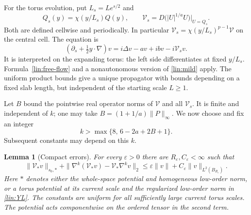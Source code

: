 \documentclass[11pt]{article}
\numberwithin{equation}{section}
\newtheorem{lemma}[theorem]{Lemma}
\theoremstyle{definition}
\theoremstyle{remark}
\begin{document}
For the torus evolution, put $L_s=Le^{s/2}$ and
\begin{equation}\label{lin:torus-coefficients}
 Q_s(y)=\chi(y/L_s)Q(y),\qquad
 \mathcal V_s=D\big(|U|^{1/a}U\big)\big|_{U=Q_s}.
\end{equation}
Both are defined cellwise and periodically.  In particular
$\mathcal V_s=\chi(y/L_s)^{p-1}\mathcal V$ on the central cell.
The equation is
\begin{equation}\label{lin:torus-evolution}
 (\partial_s+\tfrac12y\cdot\nabla)v
       =i\Delta v-a v+ibv-i\mathcal V_s v.
\end{equation}
It is interpreted on the expanding torus: the left side differentiates
at fixed $y/L_s$.  Formula~\eqref{lin:free-flow} and a nonautonomous
version of \eqref{lin:mild} apply.  The uniform product bounds give a
unique propagator with bounds depending on a fixed slab length, but
independent of the starting scale $L\ge1$.

Let $B$ bound the pointwise real operator norms of $\mathcal V$ and all
$\mathcal V_s$.  It is finite and independent of $k$; one may take
$B=(1+1/a)\|P\|_\infty$.  We now choose and fix an integer
\begin{equation}\label{lin:k-choice}
 k>\max\{8,\,6-2a+2B+1\}.
\end{equation}
Subsequent constants may depend on this $k$.

\begin{lemma}[Compact errors]\label{lin:compact-error}
For every $\varepsilon>0$ there are $R_\varepsilon,C_\varepsilon<\infty$
such that
\begin{equation}\label{lin:compact-bound}
 \|\mathcal V_*v\|_{s_0,*}
 +\|\nabla^k(\mathcal V_*v)-\mathcal V_*\nabla^kv\|_2
 \le\varepsilon\|v\|+C_\varepsilon\|v\|_{L^2(B_{R_\varepsilon})}.
\end{equation}
Here $*$ denotes either the whole-space potential and homogeneous
low-order norm, or a torus potential at its current scale and the
regularized low-order norm in \eqref{lin:YL}.  The constants are uniform
for all sufficiently large current torus scales.  The potential acts
componentwise on the ordered tensor in the second term.
\end{lemma}
\end{document}
